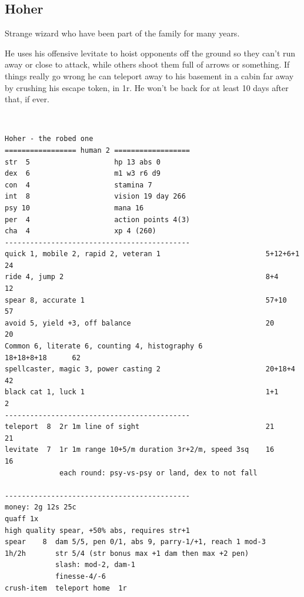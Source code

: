 \clearpage
\begin{samepage}
\subsection*{Hoher}
Strange wizard who have been part of the family for many years.

He uses his offensive levitate to hoist opponents off the ground so they can't run away or close to attack, while others shoot them full of arrows or something. If things really go wrong he can teleport away to his basement in a cabin far away by crushing his escape token, in 1r. He won't be back for at least 10 days after that, if ever.

\

\small \begin{verbatim}
Hoher - the robed one
================= human 2 ==================
str  5                    hp 13 abs 0
dex  6                    m1 w3 r6 d9
con  4                    stamina 7
int  8                    vision 19 day 266
psy 10                    mana 16
per  4                    action points 4(3)
cha  4                    xp 4 (260)
--------------------------------------------
quick 1, mobile 2, rapid 2, veteran 1                         5+12+6+1        24
ride 4, jump 2                                                8+4             12
spear 8, accurate 1                                           57+10           57
avoid 5, yield +3, off balance                                20              20
Common 6, literate 6, counting 4, histography 6               18+18+8+18      62
spellcaster, magic 3, power casting 2                         20+18+4         42
black cat 1, luck 1                                           1+1              2
--------------------------------------------
teleport  8  2r 1m line of sight                              21              21
levitate  7  1r 1m range 10+5/m duration 3r+2/m, speed 3sq    16              16
             each round: psy-vs-psy or land, dex to not fall

--------------------------------------------
money: 2g 12s 25c
quaff 1x
high quality spear, +50% abs, requires str+1
spear    8  dam 5/5, pen 0/1, abs 9, parry-1/+1, reach 1 mod-3
1h/2h       str 5/4 (str bonus max +1 dam then max +2 pen)
            slash: mod-2, dam-1
            finesse-4/-6
crush-item  teleport home  1r
\end{verbatim} \normalsize
\end{samepage}





